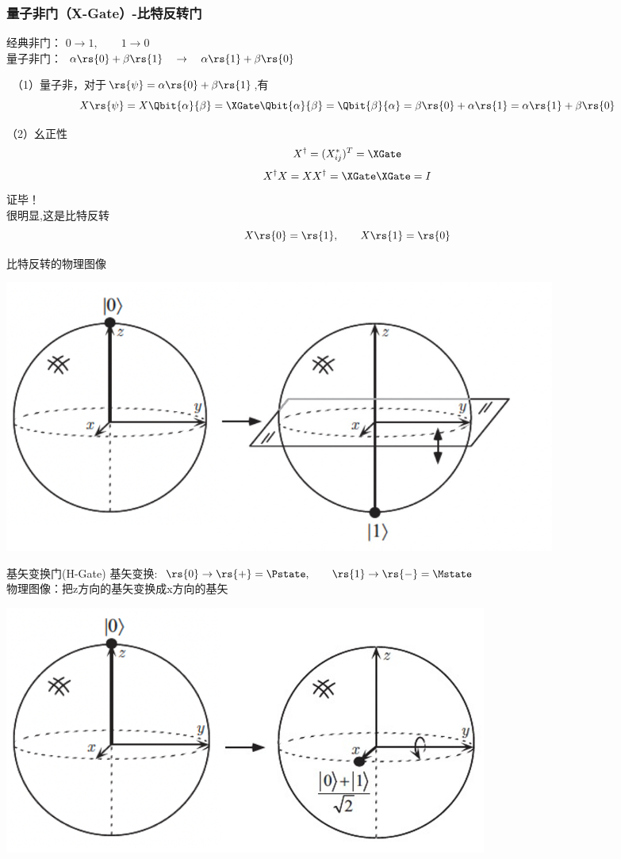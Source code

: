 \begin{frame} 
    \frametitle{量子非门（X-Gate）-比特反转门} 
    经典非门： $0\to 1, \qquad 1 \to 0$ \\
    量子非门： $\alpha\rs{0}+\beta\rs{1} \quad \to \quad\alpha\rs{1}+\beta\rs{0}$ \\ \vspace{1em}

    \证~（1）量子非，对于$\rs{\psi} =\alpha\rs{0}+\beta\rs{1}$,有
    \[X \rs{\psi} = X \Qbit{\alpha}{\beta}=\XGate\Qbit{\alpha}{\beta} =\Qbit{\beta}{\alpha}=\beta\rs{0}+\alpha\rs{1}=\alpha\rs{1}+\beta\rs{0}
    \]
\end{frame} 

\begin{frame}     
    （2）幺正性
    \[X^\dagger =(X_{ij} ^*)^T=\XGate\]
    \[X^\dagger X = XX^\dagger =\XGate \XGate=I\]
    证毕！\\ \vspace{1em}
    {\Bullet} 很明显,这是比特反转
    \[ X\rs{0}= \rs{1},\qquad X\rs{1}= \rs{0}
    \]
\end{frame}

\begin{frame}{}
    比特反转的物理图像
    \begin{center}
        \includegraphics[width=0.8\textwidth]{figs/13.png}     
    \end{center}  
\end{frame}

\begin{frame}{基矢变换门(H-Gate)}
    基矢变换: $\rs{0} \to \rs{+} =\Pstate, \qquad \rs{1} \to \rs{-} =\Mstate $ \\
    物理图像：把z方向的基矢变换成x方向的基矢
    \begin{center}
        \includegraphics[width=0.7\textwidth]{figs/14.png}     
    \end{center} 
\end{frame}

